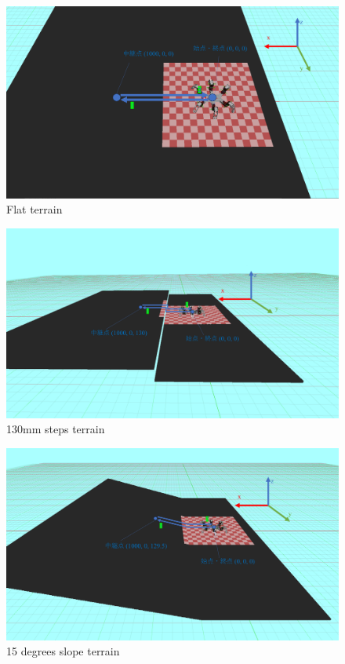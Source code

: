 \begin{figure}[htbp]
  \begin{center}
    \includegraphics[width=0.7\linewidth]{figure/chapter4/integration_flat_map.png}
    \caption{Flat terrain}
    \label{fig:ch4_integration_flat_map}  %
  \end{center}
\end{figure}

\begin{figure}[htbp]
  \begin{center}
    \includegraphics[width=0.7\linewidth,trim={50 50 50 50}, clip]{figure/chapter4/integration_130mm_map.png}
    \caption{130mm steps terrain}
    \label{fig:ch4_integration_130mm_map}  %
  \end{center}
\end{figure}

\begin{figure}[htbp]
  \begin{center}
    \includegraphics[width=0.7\linewidth,trim={50 50 50 50}, clip]{figure/chapter4/integration_15deg_map.png}
    \caption{15 degrees slope terrain}
    \label{fig:ch4_integration_15deg_map}  %
  \end{center}
\end{figure}

